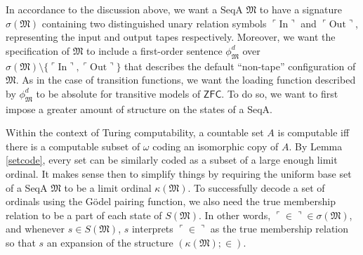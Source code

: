 \documentclass[12pt, twoside]{memoir}
\numberwithin{equation}{section}
\theoremstyle{definition}
\theoremstyle{remark}
\theoremstyle{definition}
\theoremstyle{definition}
\theoremstyle{definition}
\theoremstyle{remark}
\begin{document}
In accordance to the discussion above, we want a SeqA $\mathfrak{M}$ to have a signature $\sigma(\mathfrak{M})$ containing two distinguished unary relation symbols $\ulcorner \mathrm{In} \urcorner$ and $\ulcorner \mathrm{Out} \urcorner$, representing the input and output tapes respectively. Moreover, we want the specification of $\mathfrak{M}$ to include a first-order sentence $\phi^d_{\mathfrak{M}}$ over $\sigma(\mathfrak{M}) \setminus \{\ulcorner \mathrm{In} \urcorner, \ulcorner \mathrm{Out} \urcorner\}$ that describes the default ``non-tape'' configuration of $\mathfrak{M}$. As in the case of transition functions, we want the loading function described by $\phi^d_{\mathfrak{M}}$ to be absolute for transitive models of $\mathsf{ZFC}$. To do so, we want to first impose a greater amount of structure on the states of a SeqA.

Within the context of Turing computability, a countable set $A$ is computable iff there is a computable subset of $\omega$ coding an isomorphic copy of $A$. By Lemma \ref{setcode}, every set can be similarly coded as a subset of a large enough limit ordinal. It makes sense then to simplify things by requiring the uniform base set of a SeqA $\mathfrak{M}$ to be a limit ordinal $\kappa(\mathfrak{M})$. To successfully decode a set of ordinals using the G\"{o}del pairing function, we also need the true membership relation to be a part of each state of $S(\mathfrak{M})$. In other words, $\ulcorner \in \urcorner \in \sigma(\mathfrak{M})$, and whenever $s \in S(\mathfrak{M})$, $s$ interprets $\ulcorner \in \urcorner$ as the true membership relation so that $s$ an expansion of the structure $(\kappa(\mathfrak{M}); \in)$.
\end{document}
